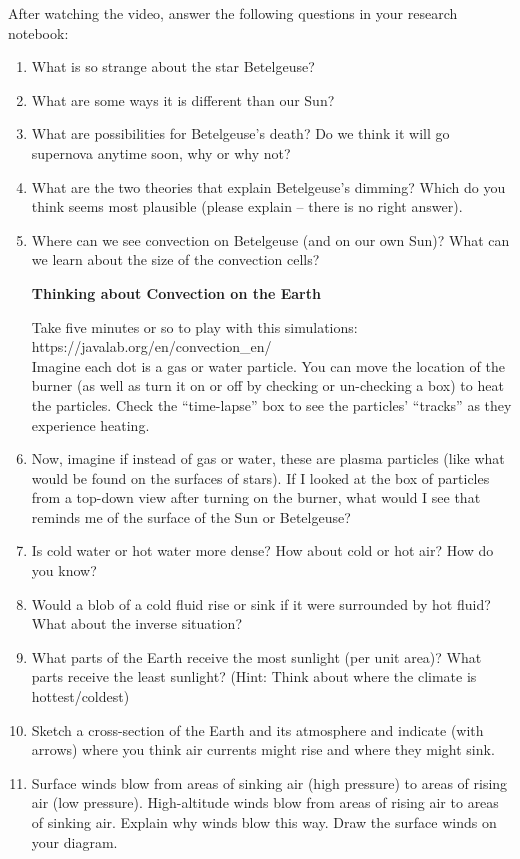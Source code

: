 \documentclass[letterpaper,11pt]{article}
\begin{document}
After watching the video, answer the following questions in your research notebook: 

\vspace{.1in}
\begin{enumerate}
\item What is so strange about the star Betelgeuse?
\item What are some ways it is different than our Sun?
\item What are possibilities for Betelgeuse's death? Do we think it will go supernova anytime soon, why or why not?
\item What are the two theories that explain Betelgeuse's dimming? Which do you think seems most plausible (please explain -- there is no right answer). 
\item Where can we see convection on Betelgeuse (and on our own Sun)? What can we learn about the size of the convection cells?
\vspace{.2in}

\textbf{\Large{Thinking about Convection on the Earth}}
\vspace{.1in}

Take five minutes or so to play with this simulations: https://javalab.org/en/convection_en/ \\

Imagine each dot is a gas or water particle. You can move the location of the burner (as well as turn it on or off by checking or un-checking a box) to heat the particles. Check the ``time-lapse'' box to see the particles' ``tracks'' as they experience heating. 

\item Now, imagine if instead of gas or water, these are plasma particles (like what would be found on the surfaces of stars). If I looked at the box of particles from a top-down view after turning on the burner, what would I see that reminds me of the surface of the Sun or Betelgeuse?

\item Is cold water or hot water more dense?  How about cold or hot air? How do you know?
\item Would a blob of a cold fluid rise or sink if it were surrounded by 
hot fluid?  What about the inverse situation?
\item What parts of the Earth receive the most sunlight (per unit area)?
What parts receive the least sunlight? (Hint: Think about where the climate is hottest/coldest)
\item Sketch a cross-section of the Earth and its atmosphere and indicate
(with arrows) where you think air currents might rise and where they might
sink.
\item Surface winds blow from areas of sinking air (high pressure) to 
areas of rising air (low pressure).  High-altitude winds blow from areas
of rising air to areas of sinking air.  Explain why winds blow this way.
Draw the surface winds on your diagram.
\vspace{.2in}


\end{enumerate}
\end{document}

